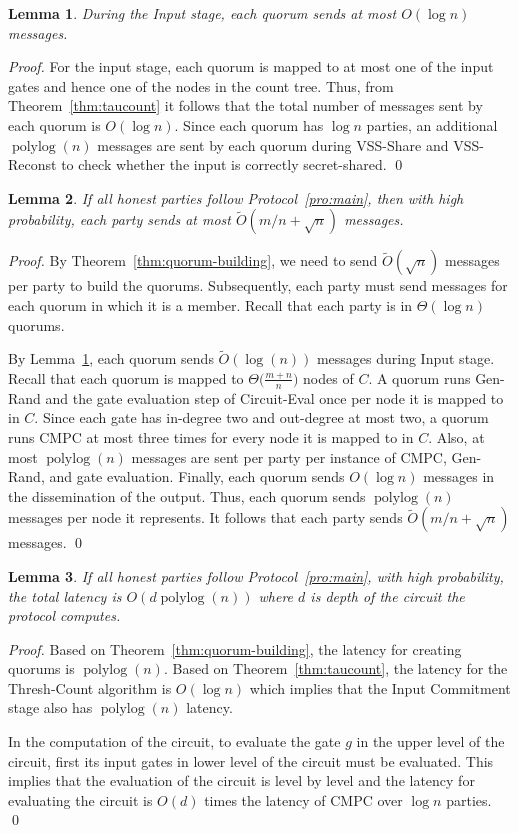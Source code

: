 \documentclass[11pt,letter]{article}
\newcommand{\alg}[1]{\mbox{\textsf{#1}}}
\DeclareMathOperator{\polylog}{polylog}
\theoremstyle{mytheoremstyle}
\newtheorem{lemma}{Lemma}
\newcommand{\vssSh}{\textsf{VSS-Share}\xspace}
\newcommand{\vssRec}{\textsf{VSS-Reconst}\xspace}
\newcommand{\hw}{\mbox{\textsf{CMPC}}\xspace}
\newcommand{\ce}{\textsf{Circuit-Eval}\xspace}
\begin{document}
\begin{lemma} \label{lem:iccost} 
	During the Input stage, each quorum sends at most $O(\log n)$ messages.
\end{lemma}
\begin{proof}
	For the input stage, each quorum is mapped to at most one of the input gates and hence one of the nodes in the count tree. Thus, from Theorem~\ref{thm:taucount} it follows that the total number of messages sent by each quorum is $O(\log n)$. Since each quorum has $\log{n}$ parties, an additional $\polylog(n)$ messages are sent by each quorum during  \vssSh and \vssRec to check whether the input is correctly secret-shared.
	\qed
\end{proof}

\begin{lemma}
	If all honest parties follow Protocol~\ref{pro:main}, then with high probability, each party sends at most $\tilde{O}(m/n+\sqrt{n})$ messages.
\end{lemma}
\begin{proof}
	By Theorem~\ref{thm:quorum-building}, we need to send $\tilde{O}(\sqrt{n})$ messages per party to build the quorums. Subsequently, each party must send messages for each quorum in which it is a member. Recall that each party is in $\Theta(\log n)$ quorums.
	
	By Lemma~\ref{lem:iccost}, each quorum sends $\tilde{O}(\log(n))$ messages during Input stage. Recall that each quorum is mapped to $\Theta\big(\frac{m+n}{n}\big)$ nodes of $C$.
	A quorum runs \textsf{Gen-Rand} and the gate evaluation step of \ce once per node it is mapped to in $C$.
	Since each gate has in-degree two and out-degree at most two, a quorum runs \hw at most three times for every node it is mapped to in $C$. Also, at most $\polylog(n)$ messages are sent per party per instance of \hw, \textsf{Gen-Rand}, and gate evaluation. Finally, each quorum sends $O(\log n)$ messages in the dissemination of the output. Thus, each quorum sends $\polylog(n)$ messages per node it represents. It follows that each party sends $\tilde{O}(m/n +\sqrt{n})$ messages.
	\qed
\end{proof}

\begin{lemma}
	If all honest parties follow Protocol~\ref{pro:main}, with high probability, the total latency is $O(d\polylog(n))$ where $d$ is depth of the circuit the protocol computes.
\end{lemma}
\begin{proof}
	Based on Theorem~\ref{thm:quorum-building}, the latency for creating quorums is $\polylog(n)$. Based on Theorem~\ref{thm:taucount}, the latency for the \alg{Thresh-Count} algorithm is $O(\log{n})$ which implies that the Input Commitment stage also has $\polylog(n)$ latency.
	
	In the computation of the circuit, to evaluate the gate $g$ in the upper level of the circuit, first its input gates in lower level of the circuit must be evaluated. This implies that the evaluation of the circuit is level by level and the latency for evaluating the circuit is $O(d)$ times the latency of \hw over $\log{n}$ parties.
	\qed
\end{proof}
\end{document}
